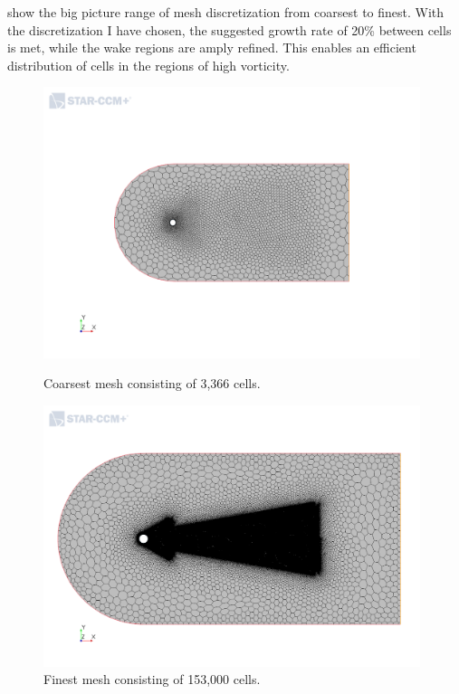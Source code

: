 \documentclass[10pt,english]{article}
\begin{document}
 show the big picture range of mesh discretization from coarsest to finest.  With the discretization I have chosen, the suggested growth rate of 20\% between cells is met, while the wake regions are amply refined.  This enables an efficient distribution of cells in the regions of high vorticity. 

\begin{figure}[h]
\centering
\begin{minipage}{.49\textwidth}
  \centering
\includegraphics[trim={7.0cm 7.5cm 7.5cm 6.5cm},clip,width=0.98\textwidth]{cylinder_2_1_MeshScene2.png}
\caption{Coarsest mesh consisting of 3,366 cells.}
\label{f:cylinder_2_1_MeshScene2}
\end{minipage}%
\hspace{5pt}
\begin{minipage}{.49\textwidth}
  \centering
\includegraphics[trim={1.5cm 3.9cm 2.5cm 2.7cm},clip,width=0.98\textwidth]{cylinder_2_625_MeshScene2.png}
\caption{\vspace{0pt}Finest mesh consisting of 153,000 cells.}
\label{f:cylinder_2_625_MeshScene2}
\end{minipage}
\end{figure}
\end{document}
